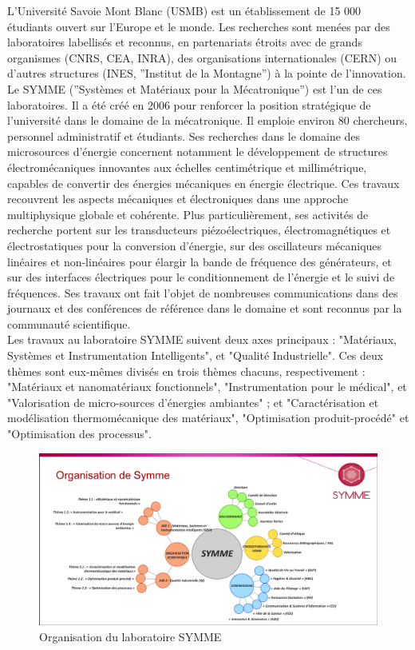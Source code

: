 \documentclass[a4paper, french, 12pt, titlepage]{article}
\begin{document}
L’Université Savoie Mont Blanc (USMB) est un établissement de 15 000 étudiants ouvert sur l’Europe et le monde. 
Les recherches sont menées par des laboratoires labellisés et reconnus, en partenariats étroits avec de grands organismes (CNRS, CEA, INRA), des organisations internationales (CERN) ou d’autres structures (INES, ”Institut de la Montagne”) à la pointe de l’innovation.
 Le SYMME (”Systèmes et Matériaux pour la Mécatronique”) est l’un de ces laboratoires. 
 Il a été créé en 2006 pour renforcer la position stratégique de l’université dans le domaine de la mécatronique. 
 Il emploie environ 80 chercheurs, personnel administratif et étudiants. 
 Ses recherches dans le domaine des microsources d’énergie concernent notamment le développement de structures électromécaniques innovantes aux échelles centimétrique et millimétrique, capables de convertir des énergies mécaniques en énergie électrique. 
 Ces travaux recouvrent les aspects mécaniques et électroniques dans une approche multiphysique globale et cohérente. 
 Plus particulièrement, ses activités de recherche portent sur les transducteurs piézoélectriques, électromagnétiques et électrostatiques pour la conversion d’énergie, sur des oscillateurs mécaniques linéaires et non-linéaires pour élargir la bande de fréquence des générateurs, et sur des interfaces électriques pour le conditionnement de l’énergie et le suivi de fréquences. 
 Ses travaux ont fait l’objet de nombreuses communications dans des journaux et des conférences de référence dans le domaine et sont reconnus par la communauté scientifique.\\


Les travaux au laboratoire SYMME suivent deux axes principaux : "Matériaux, Systèmes et Instrumentation Intelligents", et "Qualité Industrielle". 
Ces deux thèmes sont eux-mêmes divisés en trois thèmes chacuns, respectivement : "Matériaux et nanomatériaux fonctionnels", "Instrumentation pour le médical", et "Valorisation de micro-sources d'énergies ambiantes" ; et "Caractérisation et modélisation thermomécanique des matériaux", "Optimisation produit-procédé" et "Optimisation des processus". \\

\begin{figure}[H]
  \includegraphics[width=\linewidth]{organigramme.png}
  \caption{Organisation du laboratoire SYMME}
  \label{fig:fig1}
\end{figure}
\end{document}
